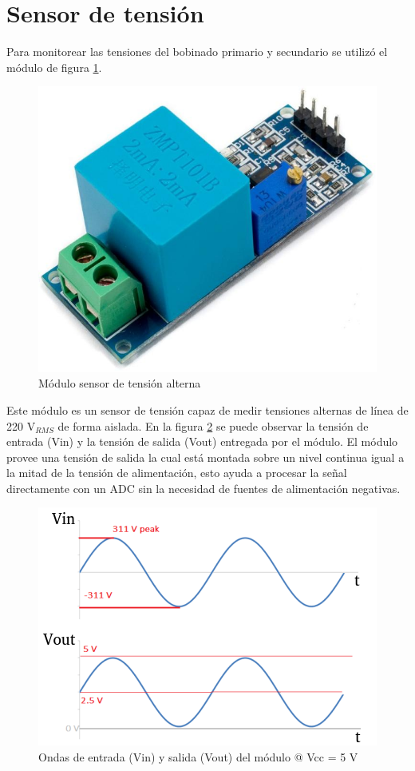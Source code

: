\section{Sensor de tensión}
\label{sec:secZMPT101B}

Para monitorear las tensiones del bobinado primario y secundario se utilizó el módulo de figura \ref{fig:ZMPT101B}.

\begin{figure}[htpb]
	\centering
	\includegraphics[scale=.3]{./Figures/zmpt101b.jpg}
	\caption{Módulo sensor de tensión alterna}
	\label{fig:ZMPT101B}
\end{figure}

Este módulo es un sensor de tensión capaz de medir tensiones alternas de línea de 220 V$_{RMS}$ de forma aislada. En la figura \ref{fig:ZMPT101B_waves} se puede observar la tensión de entrada (Vin) y la tensión de salida (Vout) entregada por el módulo. El módulo provee una tensión de salida la cual está montada sobre un nivel continua igual a la mitad de la tensión de alimentación, esto ayuda a procesar la señal directamente con un ADC sin la necesidad de fuentes de alimentación negativas.

\begin{figure}[htpb]
	\centering
	\includegraphics[scale=1.2]{./Figures/ZMPT101B_waves.png}
	\caption{Ondas de entrada (Vin) y salida (Vout) del módulo @ Vcc = 5 V}
	\label{fig:ZMPT101B_waves}
\end{figure}

